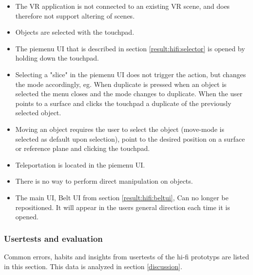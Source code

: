 \begin{itemize}
  \item The VR application is not connected to an existing VR scene, and does therefore not support altering of scenes.
  \item Objects are selected with the touchpad.
  \item The piemenu UI that is described in section \ref{result:hifi:selector} is opened by holding down the touchpad.
  \item Selecting a "slice" in the piemenu UI does not trigger the action, but changes the mode accordingly, eg. When duplicate is pressed when an object is selected the menu closes and the mode changes to duplicate. When the user points to a surface and clicks the touchpad a duplicate of the previously selected object.
  \item Moving an object requires the user to select the object (move-mode is selected as default upon selection), point to the desired position on a surface or reference plane and clicking the touchpad.
  \item Teleportation is located in the piemenu UI.
  \item There is no way to perform direct manipulation on objects.
  \item The main UI, Belt UI from section \ref{result:hifi:beltui}, Can no longer be repositioned. It will appear in the users general direction each time it is opened.

\end{itemize}

\subsubsection{Usertests and evaluation}
Common errors, habits and insights from usertests of the hi-fi prototyps are listed in this section. This data is analyzed in section \ref{discussion}.

